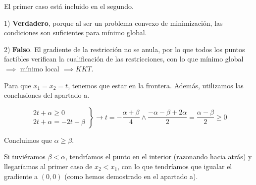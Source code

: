 \begin{problem}[5]
El primer caso está incluido en el segundo. 

\spart 

1) \textbf{Verdadero}, porque al ser un problema convexo de minimización, las condiciones son suficientes para mínimo global.

2) \textbf{Falso}.
%
El gradiente de la restricción no se anula, por lo que todos los puntos factibles verifican la cualificación de las restricciones, con lo que mínimo global  $\implies$ mínimo local $\implies KKT$.


\spart Para que $x_1 = x_2 = t$, tenemos que estar en la frontera.
%
Además, utilizamos las conclusiones del apartado a.

\[
\left.
	\begin{array}{c}
		2t+α≥0\\
		2t+α = -2t-β
	\end{array}
\right\}
\to t = -\frac{α+β}{4} \wedge \frac{-α-β+2α}{2} = \frac{α-β}{2} ≥ 0
\]

Concluimos que $α≥β$.

\obs Si tuviéramos $β<α$, tendríamos el punto en el interior (razonando hacia atrás) y llegaríamos al primer caso de $x_2<x_1$, con lo que tendríamos que igualar el gradiente a $(0,0)$ (como hemos demostrado en el apartado a).

\end{problem}

